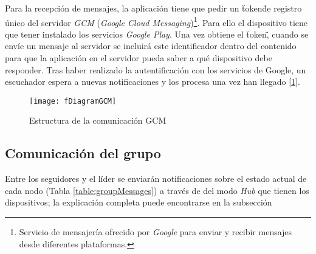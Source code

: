 Para la recepción de mensajes, la aplicación tiene que pedir un \"token\" de registro único del servidor \emph{GCM} (\emph{Google Cloud Messaging})\footnote{Servicio de mensajería ofrecido por \emph{Google} para enviar y recibir mensajes desde diferentes plataformas.}. Para ello el dispositivo tiene que tener instalado los servicios \emph{Google Play}. Una vez obtiene el \"token\", cuando se envíe un mensaje al servidor se incluirá este identificador dentro del contenido para que la aplicación en el servidor pueda saber a qué dispositivo debe responder. Tras haber realizado la autentificación con los servicios de Google, un escuchador espera a nuevas notificaciones y los procesa una vez han llegado [\ref{figure:DiagramGCM}].
\begin{figure}[h]
	\texttt{[image: fDiagramGCM]}
	\caption{Estructura de la comunicación GCM}
	\label{figure:DiagramGCM}
\end{figure}

\subsection{Comunicación del grupo}\label{ssection:comunicacion_grupo}
Entre los seguidores y el líder se enviarán notificaciones sobre el estado actual de cada nodo (Tabla \ref{table:groupMessages}) a través de del modo \emph{Hub} que tienen los dispositivos; la explicación completa puede encontrarse en la subsección %

